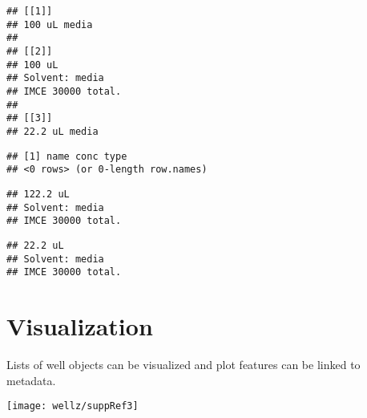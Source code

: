 \begin{knitrout}
\begin{kframe}
\begin{alltt}
\end{alltt}
\begin{verbatim}
## [[1]]
## 100 uL media
## 
## [[2]]
## 100 uL 
## Solvent: media
## IMCE 30000 total.
## 
## [[3]]
## 22.2 uL media
\end{verbatim}
\begin{alltt}
\hlstd{solutions[[}\hlstd{]]}\hlopt{$}
\end{alltt}
\begin{verbatim}
## [1] name conc type
## <0 rows> (or 0-length row.names)
\end{verbatim}
\begin{alltt}
\hlstd{solutions[[}\hlstd{]]} \hlopt{+} \hlstd{solutions[[}\hlstd{]]}
\end{alltt}
\begin{verbatim}
## 122.2 uL 
## Solvent: media
## IMCE 30000 total.
\end{verbatim}
\begin{alltt}
\hlstd{solutions[[}\hlstd{]]} \hlopt{+} \hlstd{solutions[[}\hlstd{]]} \hlopt{-} \hlstd{solutions[[}\hlstd{]]}
\end{alltt}
\begin{verbatim}
## 22.2 uL 
## Solvent: media
## IMCE 30000 total.
\end{verbatim}
\end{kframe}
\end{knitrout}
\doublespacing

\section{Visualization}

Lists of well objects can be visualized and plot features can be linked to metadata.

\begin{knitrout}
\color{fgcolor}\begin{kframe}
\begin{alltt}
  \hlstd{=} \hlstd{,}  \hlstd{=} \hlstd{,}  \hlstd{=} \hlstd{)}
\end{alltt}
\end{kframe}
\texttt{[image: wellz/suppRef3]} 
\end{knitrout}

